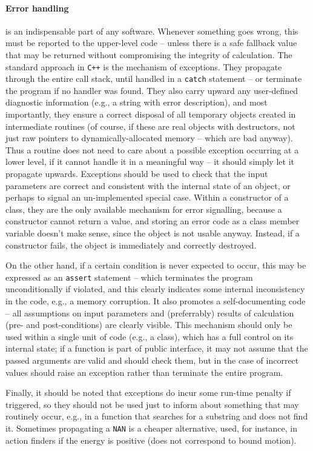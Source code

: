 \documentclass[12pt]{article}
\newcommand{\Cpp}  {\texttt{C++}\xspace}
\begin{document}
\paragraph{Error handling} \label{sec:Exceptions}  is an indispensable part of any software. Whenever something goes wrong, this must be reported to the upper-level code -- unless there is a safe fallback value that may be returned without compromising the integrity of calculation. The standard approach in \Cpp is the mechanism of exceptions. They propagate through the entire call stack, until handled in a \texttt{catch} statement -- or terminate the program if no handler was found. They also carry upward any user-defined diagnostic information (e.g., a string with error description), and most importantly, they ensure a correct disposal of all temporary objects created in intermediate routines (of course, if these are real objects with destructors, not just raw pointers to dynamically-allocated memory -- which are bad anyway). 
Thus a routine does not need to care about a possible exception occurring at a lower level, if it cannot handle it in a meaningful way -- it should simply let it propagate upwards. Exceptions should be used to check that the input parameters are correct and consistent with the internal state of an object, or perhaps to signal an un-implemented special case. Within a constructor of a class, they are the only available mechanism for error signalling, because a constructor cannot return a value, and storing an error code as a class member variable doesn't make sense, since the object is not usable anyway. Instead, if a constructor fails, the object is immediately and correctly destroyed.

On the other hand, if a certain condition is never expected to occur, this may be expressed as an \texttt{assert} statement -- which terminates the program unconditionally if violated, and this clearly indicates some internal inconsistency in the code, e.g., a memory corruption. It also promotes a self-documenting code -- all assumptions on input parameters and (preferrably) results of calculation (pre- and post-conditions) are clearly visible. This mechanism should only be used within a single unit of code (e.g., a class), which has a full control on its internal state; if a function is part of public interface, it may not assume that the passed arguments are valid and should check them, but in the case of incorrect values should raise an exception rather than terminate the entire program.

Finally, it should be noted that exceptions do incur some run-time penalty if triggered, so they should not be used just to inform about something that may routinely occur, e.g., in a function that searches for a substring and does not find it. Sometimes propagating a \texttt{NAN} is a cheaper alternative, used, for instance, in action finders if the energy is positive (does not correspond to bound motion).
\end{document}
